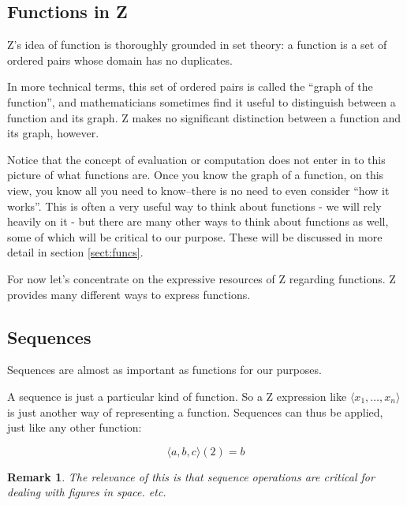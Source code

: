 \documentclass[12pt]{tufte-handout}
\numberwithin{equation}{subsection}
\numberwithin{equation}{subsection}
\newtheorem{remark}{Remark}
\begin{document}
\subsection{Functions in Z}
\label{subs:zfuncs}

Z's idea of function is thoroughly grounded in set theory: a function
is a set of ordered pairs whose domain has no
duplicates.

In more technical terms, this set of ordered pairs is called the
``graph of the function'', and mathematicians sometimes find it useful
to distinguish between a function and its graph.  Z makes no
significant distinction between a function and its graph, however.

Notice that the concept of evaluation or computation does not enter in
to this picture of what functions are.  Once you know the graph of a
function, on this view, you know all you need to know--there is no
need to even consider ``how it works''.  This is often a very useful
way to think about functions - we will rely heavily on it - but there
are many other ways to think about functions as well, some of which
will be critical to our purpose.  These will be discussed in more
detail in section \ref{sect:funcs}.

For now let's concentrate on the expressive resources of Z regarding
functions.  Z provides many different ways to express functions.

\subsection{Sequences}
\label{sect:seqs}

Sequences are almost as important as functions for our purposes.

A sequence is just a particular kind of function.  So a Z expression
like \(\langle x_1,\ldots,x_n\rangle\) is just another way of
representing a function.  Sequences can thus be applied, just like
any other function:

\[\langle a,b,c\rangle(2) = b\]

\begin{remark}
  The relevance of this is that sequence operations are critical for dealing with figures in space. etc.
\end{remark}

\end{document}

